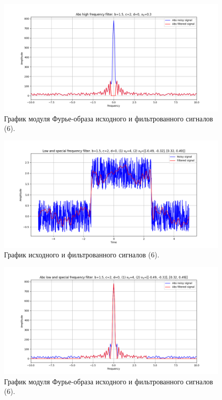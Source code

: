 \documentclass[a4paper, 12pt]{article}
\begin{document}
    \begin{figure}[H]
        \centering
        \includegraphics[scale=0.48]{6_2_abs_u_U_nospec.png}
        \captionsetup{skip=0pt}
        \caption{График модуля Фурье-образа исходного и фильтрованного сигналов (6).}
        \label{fig:qoiuoi}
    \end{figure}
    \begin{figure}[!htb]
        \centering
        \includegraphics[scale=0.48]{6_3_u_flt_u_nospec.png}
        \captionsetup{skip=0pt}
        \caption{График исходного и фильтрованного сигналов (6).}
        \label{fig:sdjfsdfj}
    \end{figure}
    \begin{figure}[!htb]
        \centering
        \includegraphics[scale=0.48]{6_3_abs_u_U_nospec.png}
        \captionsetup{skip=0pt}
        \caption{График модуля Фурье-образа исходного и фильтрованного сигналов (6).}
        \label{fig:oirjghofgj}
    \end{figure}
\end{document}
